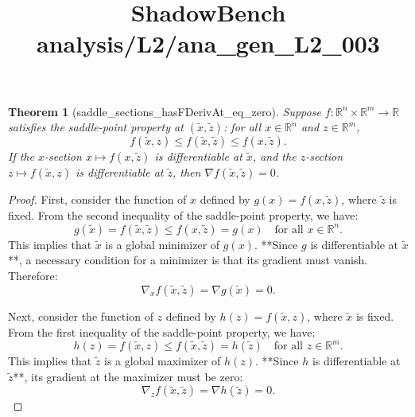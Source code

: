 \documentclass{article}
\title{ShadowBench analysis/L2/ana\_gen\_L2\_003}
\newtheorem{theorem}{Theorem}
\begin{document}
\maketitle

\begin{theorem}[saddle_sections_hasFDerivAt_eq_zero]
Suppose $f : \mathbb{R}^n \times \mathbb{R}^m \to \mathbb{R}$ satisfies the \textit{saddle-point property} at $(\tilde{x}, \tilde{z})$: for all $x \in \mathbb{R}^n$ and $z \in \mathbb{R}^m$, 
\[
f(\tilde{x}, z) \le f(\tilde{x}, \tilde{z}) \le f(x, \tilde{z}).
\]
If the $x$-section $x \mapsto f(x, \tilde{z})$ is differentiable at $\tilde{x}$, and the $z$-section $z \mapsto f(\tilde{x}, z)$ is differentiable at $\tilde{z}$, then $\nabla f(\tilde{x}, \tilde{z}) = 0$.
\end{theorem}

\begin{proof}
First, consider the function of $x$ defined by $g(x) = f(x, \tilde{z})$, where $\tilde{z}$ is fixed. From the second inequality of the saddle-point property, we have:
\[
g(\tilde{x}) = f(\tilde{x}, \tilde{z}) \le f(x, \tilde{z}) = g(x) \quad \text{for all } x \in \mathbb{R}^n.
\]
This implies that $\tilde{x}$ is a global minimizer of $g(x)$. **Since $g$ is differentiable at $\tilde{x}$**, a necessary condition for a minimizer is that its gradient must vanish. Therefore:
\[
\nabla_x f(\tilde{x}, \tilde{z}) = \nabla g(\tilde{x}) = 0.
\]

Next, consider the function of $z$ defined by $h(z) = f(\tilde{x}, z)$, where $\tilde{x}$ is fixed. From the first inequality of the saddle-point property, we have:
\[
h(z) = f(\tilde{x}, z) \le f(\tilde{x}, \tilde{z}) = h(\tilde{z}) \quad \text{for all } z \in \mathbb{R}^m.
\]
This implies that $\tilde{z}$ is a global maximizer of $h(z)$. **Since $h$ is differentiable at $\tilde{z}$**, its gradient at the maximizer must be zero:
\[
\nabla_z f(\tilde{x}, \tilde{z}) = \nabla h(\tilde{z}) = 0.
\]
\end{proof}
\end{document}
